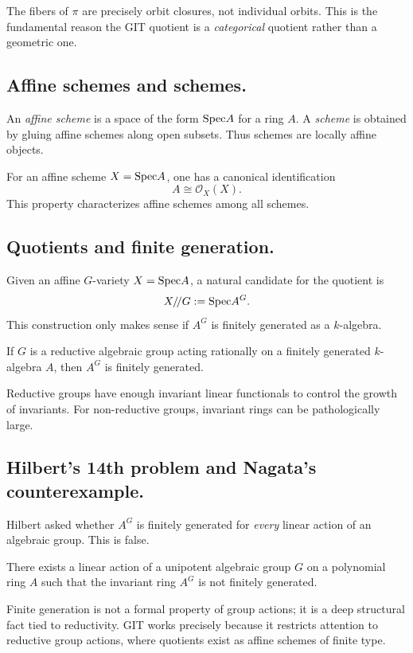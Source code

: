 \begin{remark}
	The fibers of $\pi$ are precisely orbit closures, not individual orbits.
	This is the fundamental reason the GIT quotient is a \emph{categorical} quotient rather than a geometric one.
\end{remark}

\subsection{Affine schemes and schemes.}
An \emph{affine scheme} is a space of the form $\text{Spec} A$ for a ring $A$.
A \emph{scheme} is obtained by gluing affine schemes along open subsets.
Thus schemes are locally affine objects.

\begin{remark}
	For an affine scheme $X = \text{Spec} A$, one has a canonical identification
	\[
	A \cong \mathcal{O}_X(X).
	\]
	This property characterizes affine schemes among all schemes.
\end{remark}

\subsection{Quotients and finite generation.}
Given an affine $G$-variety $X = \text{Spec} A$, a natural candidate for the quotient is
\[
X /\!/ G := \text{Spec} A^G.
\]
This construction only makes sense if $A^G$ is finitely generated as a $k$-algebra.

\begin{theorem}
	If $G$ is a reductive algebraic group acting rationally on a finitely generated $k$-algebra $A$,
	then $A^G$ is finitely generated.
\end{theorem}

\begin{remark}
	Reductive groups have enough invariant linear functionals to control the growth of invariants.
	For non-reductive groups, invariant rings can be pathologically large.
\end{remark}

\subsection{Hilbert's 14th problem and Nagata's counterexample.}
Hilbert asked whether $A^G$ is finitely generated for \emph{every} linear action of an algebraic group.
This is false.

\begin{theorem}[Nagata]
	There exists a linear action of a unipotent algebraic group $G$ on a polynomial ring $A$
	such that the invariant ring $A^G$ is not finitely generated.
\end{theorem}

\begin{remark}
	Finite generation is not a formal property of group actions; it is a deep structural fact tied to
	reductivity.
	GIT works precisely because it restricts attention to reductive group actions, where quotients
	exist as affine schemes of finite type.
\end{remark}
